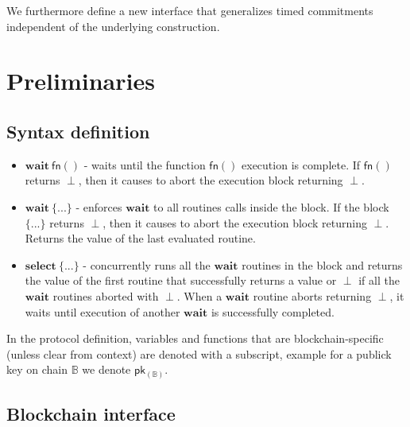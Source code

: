 \documentclass{article}      	%
\begin{document}
We furthermore define a new interface that generalizes timed commitments independent of the underlying construction.

\section{Preliminaries}


\subsection{Syntax definition}

\begin{itemize}[nosep, noitemsep]
    \item $\mathbf{wait} \: \mathsf{fn}()$ - waits until the function $\mathsf{fn}()$ execution is complete. If $\mathsf{fn}()$ returns $\perp$, then it causes to abort the execution block returning $\perp$. \\
    \item $\mathbf{wait} \: \{...\}$ - enforces $\mathbf{wait}$ to all routines calls inside the block. If the block $\{...\}$ returns $\perp$, then it causes to abort the execution block returning $\perp$. Returns the value of the last evaluated routine. \\
    \item $\mathbf{select} \: \{...\}$ - concurrently runs all the $\mathbf{wait}$ routines in the block and returns the value of the first routine that successfully returns a value or $\perp$ if all the $\mathbf{wait}$ routines aborted with $\perp$. When a $\mathbf{wait}$ routine aborts returning $\perp$, it waits until execution of another $\mathbf{wait}$ is successfully completed. \\
\end{itemize}

In the protocol definition, variables and functions that are blockchain-specific (unless clear from context) are denoted with a subscript, example for a publick key on chain $\mathbb{B}$ we denote $\mathsf{pk_{(\mathbb{B})}}$. \\


\subsection{Blockchain interface}
\end{document}
